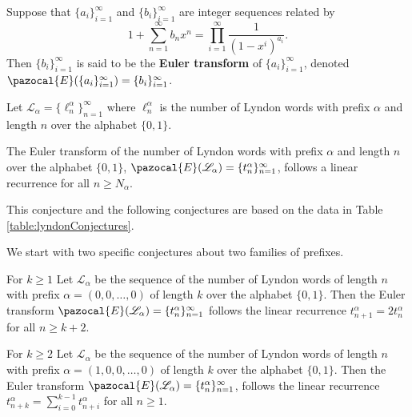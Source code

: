 \begin{definition}
  Suppose that $\{a_i\}_{i=1}^\infty$ and $\{b_i\}_{i=1}^\infty$ are integer sequences
  related by \begin{equation}
    1 + \sum_{n=1}^\infty b_n x^n = \prod_{i=1}^\infty \frac{1}{(1-x^i)^{a_i}}.
  \end{equation} Then $\{b_i\}_{i=1}^\infty$ is said to be the
  \textbf{Euler transform} of $\{a_i\}_{i=1}^\infty$, denoted
  $\pazocal{E}(\{a_i\}_{i=1}^\infty) = \{b_i\}_{i=1}^\infty$.
\end{definition}

\begin{definition}
  Let $\mathcal{L}_\alpha = \{\ell_n^\alpha\}_{n=1}^\infty$ where
  $\ell_n^\alpha$ is the number of Lyndon words with prefix $\alpha$ and length $n$
  over the alphabet $\{0,1\}$.
\end{definition}

\begin{conjecture}
  The Euler transform of the number of Lyndon words with prefix $\alpha$ and
  length $n$ over the alphabet $\{0,1\}$,
  $\pazocal{E}(\mathcal{L_\alpha}) = \{t_{n}^\alpha\}_{n=1}^\infty$,
  follows a linear recurrence for all $n \geq N_\alpha$.
\end{conjecture}

This conjecture and the following conjectures are based on the data
in Table \ref{table:lyndonConjectures}.

We start with two specific conjectures about two families of prefixes.
\begin{conjecture}
  For $k \geq 1$
  Let $\mathcal{L}_\alpha$ be the sequence of the
  number of Lyndon words of length $n$ with prefix
  ${\alpha = (0, 0, \dots, 0)}$ of length $k$ over the alphabet $\{0,1\}$.
  Then the Euler transform
  $\pazocal{E}(\mathcal{L}_\alpha) = \{t_{n}^\alpha\}_{n=1}^\infty$
  follows the linear recurrence $t_{n+1}^\alpha = 2t_{n}^\alpha$ for all
  $n \geq k + 2$.
\end{conjecture}

\begin{conjecture}
  For $k \geq 2$
  Let $\mathcal{L}_\alpha$ be the sequence of the
  number of Lyndon words of length $n$ with prefix
  ${\alpha = (1, 0, 0, \dots, 0)}$ of length $k$ over the alphabet $\{0,1\}$.
  Then the Euler transform
  $\pazocal{E}(\mathcal{L}_\alpha) = \{t_{n}^\alpha\}_{n=1}^\infty$,
  follows the linear recurrence $t_{n+k}^\alpha = \sum_{i=0}^{k-1} t_{n+i}^\alpha$
  for all $n \geq 1$.
\end{conjecture}

